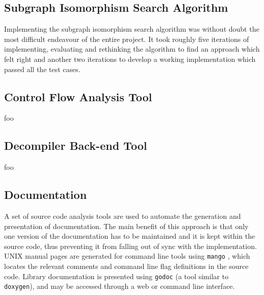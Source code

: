 \subsection{Subgraph Isomorphism Search Algorithm}

Implementing the subgraph isomorphism search algorithm was without doubt the most difficult endeavour of the entire project. It took roughly five iterations of implementing, evaluating and rethinking the algorithm to find an approach which felt right and another two iterations to develop a working implementation which passed all the test cases.



\subsection{Control Flow Analysis Tool}

foo


\subsection{Decompiler Back-end Tool}

foo


\subsection{Documentation}


A set of source code analysis tools are used to automate the generation and presentation of documentation. The main benefit of this approach is that only one version of the documentation has to be maintained and it is kept within the source code, thus preventing it from falling out of sync with the implementation. UNIX manual pages are generated for command line tools using \texttt{mango} \cite{mango}, which locates the relevant comments and command line flag definitions in the source code. Library documentation is presented using \texttt{godoc} \cite{godoc} (a tool similar to \texttt{doxygen}), and may be accessed through a web or command line interface.

